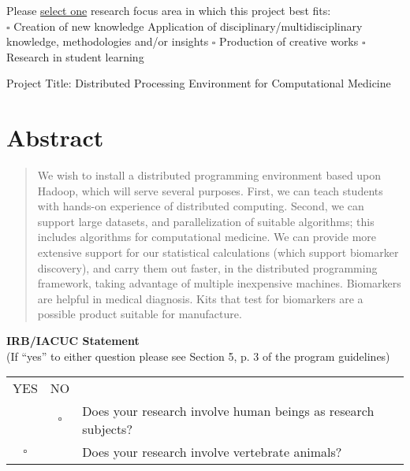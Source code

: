 \documentclass[]{article}
\begin{document}
\noindent Please \underline{select one} research focus area in which this project best fits:\\
 $\square$ Creation of new knowledge     \Checkedbox Application of disciplinary/multidisciplinary knowledge, methodologies and/or insights     $\square$ Production of creative works  $\square$ Research in student learning

Project Title: Distributed Processing Environment for Computational Medicine

	
	
	
	\section{Abstract}


\begin{center}
	\begin{abstract}
		We wish to install a distributed programming environment based upon Hadoop, which will serve several purposes. First, we can teach students with hands-on experience of distributed computing. Second, we can support large datasets, and parallelization of suitable algorithms; this includes algorithms for computational medicine. We can provide more extensive support for our statistical calculations (which support biomarker discovery), and carry them out faster, in the distributed programming framework, taking advantage of multiple inexpensive machines. Biomarkers are helpful in medical diagnosis. Kits that test for biomarkers are a possible product suitable for manufacture. %
	\end{abstract}
\end{center}
\noindent \textbf{IRB/IACUC Statement}\\
(If ``yes'' to either question please see Section 5, p. 3 of the program guidelines)\\
\begin{tabular}{ccl}
	YES  &    NO & \\
	\Checkedbox & $\square$  &Does your research involve human beings as research subjects?\\
	$\square$  &\Checkedbox &Does your research involve vertebrate animals?\\
\end{tabular}
\end{document}
